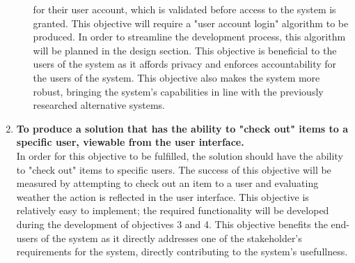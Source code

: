 \documentclass[../../../main.tex]{subfiles}
\begin{document}
\begin{enumerate}
\begin{enumerate}
                        for their user account, which is validated before access to the system is granted.
                        This objective will require a "user account login" algorithm to be produced. In order
                        to streamline the development process, this algorithm will be planned in the design section.
                        This objective is beneficial to the users of the system as it affords privacy and enforces accountability
                        for the users of the system. This objective also makes the system more robust, bringing the system's capabilities
                        in line with the previously researched alternative systems.
            \end{enumerate}

      \item \textbf{To produce a solution that has the ability to "check out" items to a specific user, viewable from the user interface.}\\
            In order for this objective to be fulfilled, the solution should have the ability to "check out" items
            to specific users. The success of this objective will be measured by attempting to check out an item
            to a user and evaluating weather the action is reflected in the user interface.
            This objective is relatively easy to implement; the required functionality will be developed during the
            development of objectives 3 and 4. This objective benefits the end-users of the system as it directly addresses
            one of the stakeholder's requirements for the system, directly contributing to the system's usefullness.

\end{enumerate}
\end{document}
